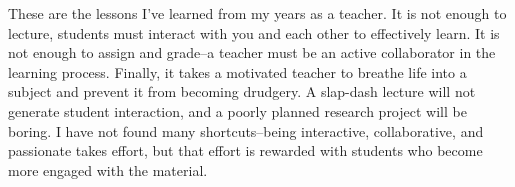 \documentclass[11pt]{article}
\begin{document}
These are the lessons I've learned from my years as a teacher.  It is not enough to lecture, students must interact with you and each other to effectively learn.  It is not enough to assign and grade--a teacher must be an active collaborator in the learning process.  Finally, it takes a motivated teacher to breathe life into a subject and prevent it from becoming drudgery.  A slap-dash lecture will not generate student interaction, and a poorly planned research project will be boring.  I have not found many shortcuts--being interactive, collaborative, and passionate takes effort, but that effort is rewarded with students who become more engaged with the material.




\end{document}
